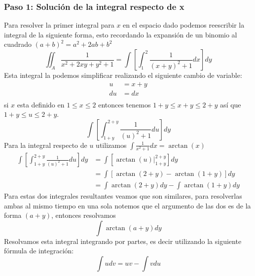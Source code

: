     \subsubsection*{Paso 1: Solución de la integral respecto de x}
        Para resolver la primer integral para $x$ en el espacio dado podemos reescribir la integral de la siguiente forma, esto recordando
        la expansión de un binomio al cuadrado $(a+b)^2 = a^2 + 2ab + b^2$
        \begin{equation*}
            \iint_A \frac{1}{x^2 +2xy + y^2 + 1} = \int \left[ \int_1^2 \frac{1}{(x + y)^2 + 1}dx \right] dy
        \end{equation*}
        Esta integral la podemos simplificar realizando el siguiente cambio de variable:
        \begin{align*}
            u & = x + y \\
            du & = dx \\
        \end{align*}
        si $x$ esta definido en $1 \leq x \leq 2$ entonces tenemos $1 + y \leq x + y \leq 2 + y$ así que $1 + y \leq u \leq 2 + y$.
        \begin{equation*}
            \int \left[ \int_{1+y}^{2+y} \frac{1}{(u)^2 + 1}du \right] dy
        \end{equation*}
        Para la integral respecto de $u$ utilizamos $\int \frac{1}{x^2 + 1} dx = \arctan(x)$
        \begin{align}
            \int \left[ \int_{1+y}^{2+y} \frac{1}{(u)^2 + 1}du \right] dy & = \int \left[ \arctan(u)|_{1+y}^{2+y} \right] dy \\
            & = \int \left[ \arctan(2+y) - \arctan(1+y) \right] dy \\
            & = \int \arctan(2+y) dy - \int \arctan(1+y) dy
            \label{eq:sol3p}
        \end{align}
        Para estas dos integrales resultantes veamos que son similares, para resolverlas ambas al mismo tiempo en una sola notemos 
        que el argumento de las dos es de la forma $(a + y)$, entonces resolvamos
        \begin{equation*}
            \int \arctan(a + y)dy
        \end{equation*}
        Resolvamos esta integral integrando por partes, es decir utilizando la siguiente fórmula de integración:
        \begin{equation*}
            \int udv = uv - \int vdu
        \end{equation*}
